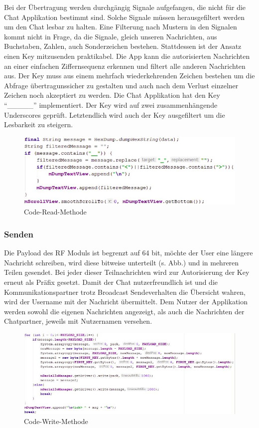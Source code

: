 \documentclass[a4paper, 12.5pt]{scrartcl}
\begin{document}
Bei der Übertragung werden durchgängig Signale aufgefangen, die nicht für die Chat Applikation bestimmt sind. Solche Signale müssen herausgefiltert werden um den Chat lesbar zu halten. Eine Filterung nach Mustern in den Signalen kommt nicht in Frage, da die Signale, gleich unseren Nachrichten, aus Buchstaben, Zahlen, auch Sonderzeichen bestehen. Stattdessen ist der Ansatz einen Key mitzusenden praktikabel. Die App kann die autorisierten Nachrichten an einer einfachen Ziffernsequenz erkennen und filtert alle anderen Nachrichten aus. Der Key muss aus einem mehrfach wiederkehrenden Zeichen bestehen um die Abfrage übertragunssicher zu gestalten und auch nach dem Verlust einzelner Zeichen noch akzeptiert zu werden. Die Chat Applikation hat den Key “\_\_\_\_\_” implementiert. Der Key wird auf zwei zusammenhängende Underscores geprüft. Letztendlich wird auch der Key ausgefiltert um die Lesbarkeit zu steigern.
\begin{figure}[h]
	\centering
	\includegraphics[scale=1.0]{read.jpg}
	\caption{Code-Read-Methode}
	\label{img:read}
\end{figure}
\newpage
\subsubsection{Senden}

Die Payload des RF Moduls ist begrenzt auf 64 bit, möchte der User eine längere Nachricht schreiben, wird diese bitweise unterteilt (s. Abb.) und in mehreren Teilen gesendet. Bei jeder dieser Teilnachrichten wird zur Autorisierung der Key erneut als Präfix gesetzt. Damit der Chat nutzerfreundlich ist und die Kommunikationspartner trotz Broadcast Sendeverhalten die Übersicht wahren, wird der Username mit der Nachricht übermittelt. Dem Nutzer der Applikation werden sowohl die eigenen Nachrichten angezeigt, als auch die Nachrichten der Chatpartner, jeweils mit Nutzernamen versehen.
\begin{figure}[h]
	\centering
	\includegraphics[scale=1.0]{write.jpg}
	\caption{Code-Write-Methode}
	\label{img:write}
\end{figure}
\newpage
\end{document}
